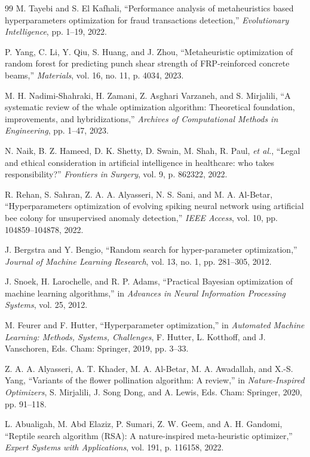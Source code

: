 \documentclass[letterpaper, 10 pt, conference]{ieeeconf}
\begin{document}
\begin{thebibliography}{99}
	 M. Tayebi and S. El Kafhali, ``Performance analysis of metaheuristics based hyperparameters optimization for fraud transactions detection,'' \emph{Evolutionary Intelligence}, pp. 1--19, 2022.

	 P. Yang, C. Li, Y. Qiu, S. Huang, and J. Zhou, ``Metaheuristic optimization of random forest for predicting punch shear strength of FRP-reinforced concrete beams,'' \emph{Materials}, vol. 16, no. 11, p. 4034, 2023.

	 M. H. Nadimi-Shahraki, H. Zamani, Z. Asghari Varzaneh, and S. Mirjalili, ``A systematic review of the whale optimization algorithm: Theoretical foundation, improvements, and hybridizations,'' \emph{Archives of Computational Methods in Engineering}, pp. 1--47, 2023.

	 N. Naik, B. Z. Hameed, D. K. Shetty, D. Swain, M. Shah, R. Paul, \emph{et al.}, ``Legal and ethical consideration in artificial intelligence in healthcare: who takes responsibility?'' \emph{Frontiers in Surgery}, vol. 9, p. 862322, 2022.

	 R. Rehan, S. Sahran, Z. A. A. Alyasseri, N. S. Sani, and M. A. Al-Betar, ``Hyperparameters optimization of evolving spiking neural network using artificial bee colony for unsupervised anomaly detection,'' \emph{IEEE Access}, vol. 10, pp. 104859--104878, 2022.

	 J. Bergstra and Y. Bengio, ``Random search for hyper-parameter optimization,'' \emph{Journal of Machine Learning Research}, vol. 13, no. 1, pp. 281--305, 2012.

	 J. Snoek, H. Larochelle, and R. P. Adams, ``Practical Bayesian optimization of machine learning algorithms,'' in \emph{Advances in Neural Information Processing Systems}, vol. 25, 2012.

	 M. Feurer and F. Hutter, ``Hyperparameter optimization,'' in \emph{Automated Machine Learning: Methods, Systems, Challenges}, F. Hutter, L. Kotthoff, and J. Vanschoren, Eds. Cham: Springer, 2019, pp. 3--33.

	 Z. A. A. Alyasseri, A. T. Khader, M. A. Al-Betar, M. A. Awadallah, and X.-S. Yang, ``Variants of the flower pollination algorithm: A review,'' in \emph{Nature-Inspired Optimizers}, S. Mirjalili, J. Song Dong, and A. Lewis, Eds. Cham: Springer, 2020, pp. 91--118.

	 L. Abualigah, M. Abd Elaziz, P. Sumari, Z. W. Geem, and A. H. Gandomi, ``Reptile search algorithm (RSA): A nature-inspired meta-heuristic optimizer,'' \emph{Expert Systems with Applications}, vol. 191, p. 116158, 2022.


\end{thebibliography}
\end{document}
